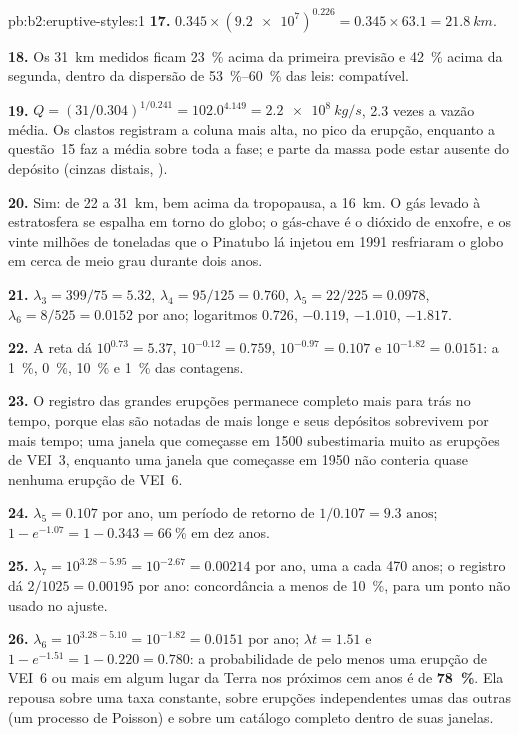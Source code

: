 \begin{solution}{pb:b2:eruptive-styles:1}
\textbf{17.} $0.345\times(\num{9.2e7})^{0.226} = 0.345\times63.1 = \qty{21.8}{km}$.

\textbf{18.} Os \qty{31}{km} medidos ficam \qty{23}{\percent} acima da primeira
previsão e \qty{42}{\percent} acima da segunda, dentro da dispersão de
\qtyrange{53}{60}{\percent} das leis: compatível.

\textbf{19.} $Q = (31/0.304)^{1/0.241} = 102.0^{4.149} = \qty{2.2e8}{kg/s}$, 2.3 vezes
a vazão média. Os clastos registram a coluna mais alta, no pico da
erupção, enquanto a questão~15 faz a média sobre toda a fase; e parte da massa
pode estar ausente do depósito (cinzas distais, ).

\textbf{20.} Sim: de 22 a \qty{31}{km}, bem acima da tropopausa, a \qty{16}{km}.
O gás levado à estratosfera se espalha em torno do globo; o gás-chave é o
dióxido de enxofre, e os vinte milhões de toneladas que o Pinatubo lá injetou em 1991
resfriaram o globo em cerca de meio grau durante dois anos.

\textbf{21.} $\lambda_3 = 399/75 = 5.32$, $\lambda_4 = 95/125 = 0.760$, $\lambda_5 = 22/225 =
0.0978$, $\lambda_6 = 8/525 = 0.0152$ por ano; logaritmos $0.726$, $-0.119$, $-1.010$,
$-1.817$.

\textbf{22.} A reta dá $10^{0.73} = 5.37$, $10^{-0.12} = 0.759$, $10^{-0.97} =
0.107$ e $10^{-1.82} = 0.0151$: a \qty{1}{\percent}, \qty{0}{\percent},
\qty{10}{\percent} e \qty{1}{\percent} das contagens.

\textbf{23.} O registro das grandes erupções permanece completo mais para trás no tempo,
porque elas são notadas de mais longe e seus depósitos sobrevivem por mais tempo; uma
janela que começasse em 1500 subestimaria muito as erupções de VEI~3, enquanto uma janela
que começasse em 1950 não conteria quase nenhuma erupção de VEI~6.

\textbf{24.} $\lambda_5 = \num{0.107}$ por ano, um período de retorno de $1/0.107 =
\num{9.3}\text{ anos}$; $1 - e^{-1.07} = 1 - 0.343 = \qty{66}{\percent}$ em dez anos.

\textbf{25.} $\lambda_7 = 10^{3.28 - 5.95} = 10^{-2.67} = 0.00214$ por ano, uma a cada
470 anos; o registro dá $2/1025 = 0.00195$ por ano: concordância a menos de
\qty{10}{\percent}, para um ponto não usado no ajuste.

\textbf{26.} $\lambda_6 = 10^{3.28 - 5.10} = 10^{-1.82} = 0.0151$ por ano; $\lambda t = 1.51$
e $1 - e^{-1.51} = 1 - 0.220 = 0.780$: a probabilidade de pelo menos uma erupção
de VEI~6 ou mais em algum lugar da Terra nos próximos cem anos é de
\textbf{\qty[text-series-to-math=true]{78}{\percent}}. Ela repousa sobre uma taxa constante,
sobre erupções independentes umas das outras (um processo de Poisson) e sobre um
catálogo completo dentro de suas janelas.
\end{solution}
